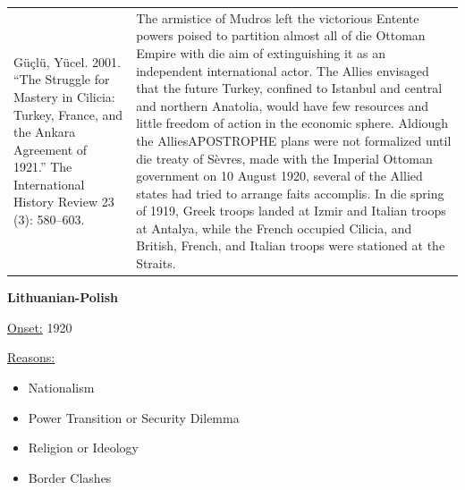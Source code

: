 {\begin{longtable}{p{}p{}}
\\
Güçlü, Yücel. 2001. “The Struggle for Mastery in Cilicia: Turkey, France, and the Ankara Agreement of 1921.” The International History Review 23 (3): 580–603.
 & The armistice of Mudros left the victorious Entente powers poised to partition almost all of die Ottoman Empire with die aim of extinguishing it as an independent international actor. The Allies envisaged that the future Turkey, confined to Istanbul and central and northern Anatolia, would have few resources and little freedom of action in the economic sphere. Aldiough the AlliesAPOSTROPHE plans were not formalized until die treaty of Sèvres, made with the Imperial Ottoman government on 10 August 1920, several of the Allied states had tried to arrange faits accomplis. In die spring of 1919, Greek troops landed at Izmir and Italian troops at Antalya, while the French occupied Cilicia, and British, French, and Italian troops were stationed at the Straits.
\\
\end{longtable}}
\clearpage
         \textbf{Lithuanian-Polish} 

          \underline{Onset:} 1920         

\underline{Reasons:}
\begin{itemize}
\item Nationalism
\item Power Transition or Security Dilemma
\item Religion or Ideology
\item Border Clashes
\end{itemize}

